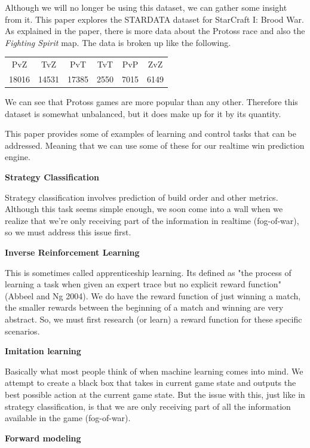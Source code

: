 \documentclass[a4paper,12pt]{report}
\newcommand{\msection}[1]{\noindent\textbf{#1}}
\begin{document}
Although we will no longer be using this dataset, we can gather some insight from it. This paper explores the STARDATA dataset for StarCraft I: Brood War. As explained in the paper, there is more data about the Protoss race and also the \textit{Fighting Spirit} map. The data is broken up like the following.
\begin{center}
    \begin{tabular}{cccccc}
        \hline PvZ & TvZ & PvT & TvT & PvP & ZvZ \\
        18016 & 14531 & 17385 & 2550 & 7015 & 6149 \\ \hline
    \end{tabular}
\end{center}
We can see that Protoss games are more popular than any other. Therefore this dataset is somewhat unbalanced, but it does make up for it by its quantity.

This paper provides some of examples of learning and control tasks that can be addressed. Meaning that we can use some of these for our realtime win prediction engine.

\msection{Strategy Classification}

Strategy classification involves prediction of build order and other metrics. Although this task seems simple enough, we soon come into a wall when we realize that we're only receiving part of the information in realtime (fog-of-war), so we must address this issue first.

\msection{Inverse Reinforcement Learning}

This is sometimes called apprenticeship learning. Its defined as "the process of learning a task when given an expert trace but no explicit reward function" (Abbeel and Ng 2004). We do have the reward function of just winning a match, the smaller rewards between the beginning of a match and winning are very abstract. So, we must first research (or learn) a reward function for these specific scenarios.

\msection{Imitation learning}

Basically what most people think of when machine learning comes into mind. We attempt to create a black box that takes in current game state and outputs the best possible action at the current game state. But the issue with this, just like in strategy classification, is that we are only receiving part of all the information available in the game (fog-of-war).

\msection{Forward modeling}
\end{document}
